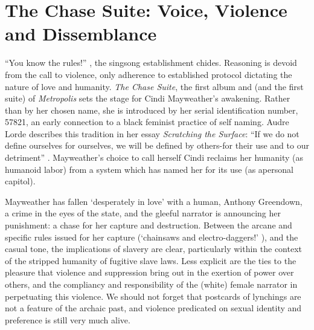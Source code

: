 \documentclass[a4paper, 11pt]{article} %
\begin{document}

\section*{The Chase Suite: Voice, Violence and Dissemblance}

``You know the rules!'' \cite{wolfmasters}, the singsong establishment chides.
Reasoning is devoid from the call to violence, only adherence to established protocol dictating the nature of love and humanity.
\emph{The Chase Suite}, the first album and (and the first suite) of \emph{Metropolis} sets the stage for Cindi Mayweather's awakening.
Rather than by her chosen name, she is introduced by her serial identification number, 57821, an early connection to a black feminist practice of self naming. 
Audre Lorde describes this tradition in her essay \emph{Scratching the Surface}: ``If we do not define ourselves for ourselves, we will be defined by others-for their use and to our detriment'' \cite{lordescratching}.
Mayweather's choice to call herself Cindi reclaims her humanity (as humanoid labor) from a system which has named her for its use (as apersonal capitol).

Mayweather has fallen `desperately in love' with a human, Anthony Greendown, a crime in the eyes of the state, and the gleeful narrator is announcing her punishment: a chase for her capture and destruction.
Between the arcane and specific rules issued for her capture (`chainsaws and electro-daggers!' \cite{wolfmasters}), and the casual tone, the implications of slavery are clear, particularly within the context of the stripped humanity of fugitive slave laws.
Less explicit are the ties to the pleasure that violence and suppression bring out in the exertion of power over others, and the compliancy and responsibility of the (white) female narrator in perpetuating this violence.
We should not forget that postcards of lynchings are not a feature of the archaic past, and violence predicated on sexual identity and preference is still very much alive.
\end{document}
